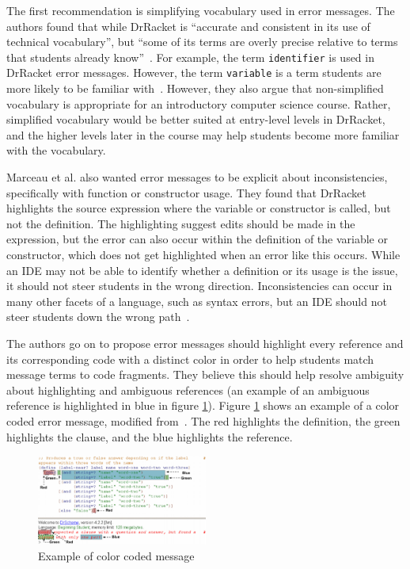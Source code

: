 \documentclass{sig-alternate}
\begin{document}
The first recommendation is simplifying vocabulary used in error messages.
The authors found that while DrRacket is ``accurate and consistent in its use of technical vocabulary'', but ``some of its terms are overly precise relative to terms that students already know''~\cite{Marceau:2011:MYL:2048237.2048241}.
For example, the term \texttt{identifier} is used in DrRacket error messages. However, the term \texttt{variable} is a term students are more likely to be familiar with~\cite{Marceau:2011:MYL:2048237.2048241}.
However, they also argue that non-simplified vocabulary is appropriate for an introductory computer science course.
Rather, simplified vocabulary would be better suited at entry-level levels in DrRacket, and the higher levels later in the course may help students become more familiar with the vocabulary.

Marceau et al. also wanted error messages to be explicit about inconsistencies, specifically with function or constructor usage.
They found that DrRacket highlights the source expression where the variable or constructor is called, but not the definition.
The highlighting suggest edits should be made in the expression, but the error can also occur within the definition of the variable or constructor, which does not get highlighted when an error like this occurs.
While an IDE may not be able to identify whether a definition or its usage is the issue, it should not steer students in the wrong direction.
Inconsistencies can occur in many other facets of a language, such as syntax errors, but an IDE should not steer students down the wrong path~\cite{Marceau:2011:MYL:2048237.2048241}.

The authors go on to propose error messages should highlight every reference and its corresponding code with a distinct color in order to help students match message terms to code fragments.
They believe this should help resolve ambiguity about highlighting and ambiguous references (an example of an ambiguous reference is highlighted in blue in figure \ref{fig:colorcodedmessage}).
Figure \ref{fig:colorcodedmessage} shows an example of a color coded error message, modified from~\cite{Marceau:2011:MYL:2048237.2048241}.
The red highlights the definition, the green highlights the clause, and the blue highlights the reference.

\begin{figure}
  \centering
  \includegraphics[keepaspectratio, width=0.50\textwidth]{ColorCodedMessage.pdf}
  \caption{Example of color coded message}
  \label{fig:colorcodedmessage}
\end{figure}
\end{document}
